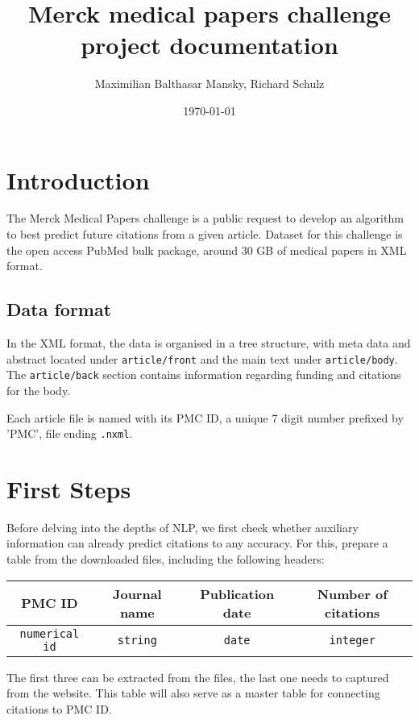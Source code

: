 \documentclass[11pt]{article}
\begin{document}
\title{Merck medical papers challenge project documentation}
\author{Maximilian Balthasar Mansky, Richard Schulz}
\date{\today}
\maketitle

\section{Introduction}

The Merck Medical Papers challenge is a public request to develop an algorithm to best predict future citations from a given article. Dataset for this challenge is the open access PubMed bulk package, around 30 GB of medical papers in XML format.

\subsection{Data format}

In the XML format, the data is organised in a tree structure, with meta data and abstract located under \texttt{article/front} and the main text under \texttt{article/body}. The \texttt{article/back} section contains information regarding funding and citations for the body.

Each article file is named with its PMC ID, a unique 7 digit number prefixed by 'PMC', file ending \texttt{.nxml}.

\section{First Steps}

Before delving into the depths of NLP, we first check whether auxiliary information can already predict citations to any accuracy. For this, prepare a table from the downloaded files, including the following headers:

\begin{table}[h!]
\begin{tabular}{c c c c}
PMC ID & Journal name & Publication date & Number of citations \\\hline
\texttt{numerical id} & \texttt{string} & \texttt{date} & \texttt{integer}
\end{tabular}
\end{table}

The first three can be extracted from the files, the last one needs to captured from the website. This table will also serve as a master table for connecting citations to PMC ID.
\end{document}

